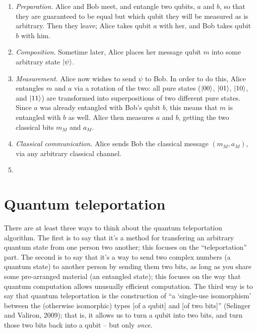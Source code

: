 \documentclass[12pt]{amsart}
\begin{document}
\begin{enumerate}
  \item \emph{Preparation.} Alice and Bob meet, and entangle two qubits, $a$ and
    $b$, so that they are guaranteed to be equal but which qubit they will be
    measured as is arbitrary.  Then they leave; Alice takes qubit $a$ with her,
    and Bob takes qubit $b$ with him.

  \item \emph{Composition.}  Sometime later, Alice places her message qubit $m$
    into some arbitrary state ${\left\vert{\psi}\right\rangle}$.

  \item \emph{Measurement.}  Alice now wishes to send $\psi$ to Bob.  In order
    to do this, Alice entangles $m$ and $a$ via a rotation of the two: all pure states (${\left\vert{00}\right\rangle}$, ${\left\vert{01}\right\rangle}$,
    ${\left\vert{10}\right\rangle}$, and ${\left\vert{11}\right\rangle}$) are transformed into superpositions of two
    different pure states.  Since $a$ was already entangled with Bob's qubit
    $b$, this means that $m$ is entangled with $b$ as well.  Alice then measures $a$ and $b$,
    getting the two classical bits $m_M$ and $a_M$.

  \item \emph{Classical communication.}  Alice sends Bob the classical message
    $(m_M,a_M)$, via any arbitrary classical channel.

  \item {} 
\end{enumerate}

\section{Quantum teleportation}\label{sec:teleportation}

There are at least three ways to think about the quantum teleportation
algorithm.  The first is to say that it's a method for transfering an arbitrary
quantum state from one person two another; this focuses on the ``teleportation''
part.  The second is to say that it's a way to send two complex numbers (a
quantum state) to another person by sending them two bits, as long as you share
some pre-arranged material (an entangled state); this focuses on the way that
quantum computation allows unusually efficient computation.  The third way is to
say that quantum teleportation is the construction of ``a `single-use
isomorphism' between the (otherwise isomorphic) types [of a qubit] and [of two
bits]''  (Selinger and Valiron, 2009); that is, it
allows us to turn a qubit into two bits, and turn those two bits back into a
qubit – but only \emph{once}.
\end{document}
